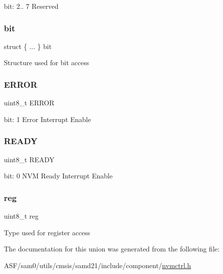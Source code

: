 bit\+: 2.. 7 Reserved \mbox{\label{union_n_v_m_c_t_r_l___i_n_t_e_n_c_l_r___type_a71c1ebbf3190424e3a6feb0dad12ddfb}} 
\subsubsection{\texorpdfstring{bit}{bit}}
{\footnotesize\ttfamily struct \{ ... \}   bit}

Structure used for bit access \mbox{\label{union_n_v_m_c_t_r_l___i_n_t_e_n_c_l_r___type_a4be51829c8720b7d159b77c39924afaa}} 
\subsubsection{\texorpdfstring{ERROR}{ERROR}}
{\footnotesize\ttfamily uint8\+\_\+t E\+R\+R\+OR}

bit\+: 1 Error Interrupt Enable \mbox{\label{union_n_v_m_c_t_r_l___i_n_t_e_n_c_l_r___type_a87c971ad119330af2fdb7bca4011addb}} 
\subsubsection{\texorpdfstring{READY}{READY}}
{\footnotesize\ttfamily uint8\+\_\+t R\+E\+A\+DY}

bit\+: 0 N\+VM Ready Interrupt Enable \mbox{\label{union_n_v_m_c_t_r_l___i_n_t_e_n_c_l_r___type_a9428adc9af4653a2050e2536b55dec8d}} 
\subsubsection{\texorpdfstring{reg}{reg}}
{\footnotesize\ttfamily uint8\+\_\+t reg}

Type used for register access 

The documentation for this union was generated from the following file\+:\begin{DoxyCompactItemize}
\item 
A\+S\+F/sam0/utils/cmsis/samd21/include/component/\mbox{\hyperlink{component_2nvmctrl_8h}{nvmctrl.\+h}}\end{DoxyCompactItemize}
